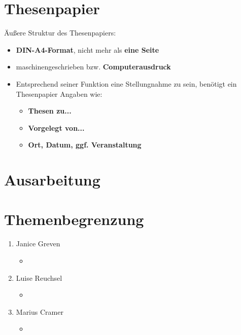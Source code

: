 \documentclass[12pt]{article}
\begin{document}
\section{\textbf{Thesenpapier}}
Äußere Struktur des Thesenpapiers:
\begin{itemize}
  \item \textbf{DIN-A4-Format}, nicht mehr als \textbf{eine Seite}
  \item maschinengeschrieben bzw. \textbf{Computerausdruck}
  \item Entsprechend seiner Funktion eine Stellungnahme zu sein, benötigt ein Thesenpapier Angaben wie:
  \begin{itemize}
    \item \textbf{Thesen zu...}
    \item \textbf{Vorgelegt von...}
    \item \textbf{Ort, Datum, ggf. Veranstaltung}
  \end{itemize}
\end{itemize}

\section{\textbf{Ausarbeitung}}

\medskip

\section{\textbf{Themenbegrenzung}} %
\begin{enumerate}
  \item Janice Greven
  \begin{itemize}
    \item %
  \end{itemize}
  \item Luise Reuchsel
  \begin{itemize}
    \item %
  \end{itemize}
  \item Marius Cramer
  \begin{itemize}
    \item %
  \end{itemize}
\end{enumerate}

\medskip
\end{document}
